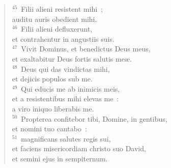 \begin{flushleft}
\begin{verse}
${}^{45}$~Filii alieni resistent mihi~;\\ auditu auris obedient mihi.\\
${}^{46}$~Filii alieni defluxerunt,\\ et contrahentur in angustiis suis.\\
${}^{47}$~Vivit Dominus, et benedictus Deus meus,\\ et exaltabitur Deus fortis salutis me\ae .\\
${}^{48}$~Deus qui das vindictas mihi,\\ et dejicis populos sub me.\\
${}^{49}$~Qui educis me ab inimicis meis,\\ et a resistentibus mihi elevas me~:\\ a viro iniquo liberabis me.\\
${}^{50}$~Propterea confitebor tibi, Domine, in gentibus,\\ et nomini tuo cantabo~:\\
${}^{51}$~magnificans salutes regis sui,\\ et faciens misericordiam christo suo David,\\ et semini ejus in sempiternum.\end{verse}\end{flushleft}




